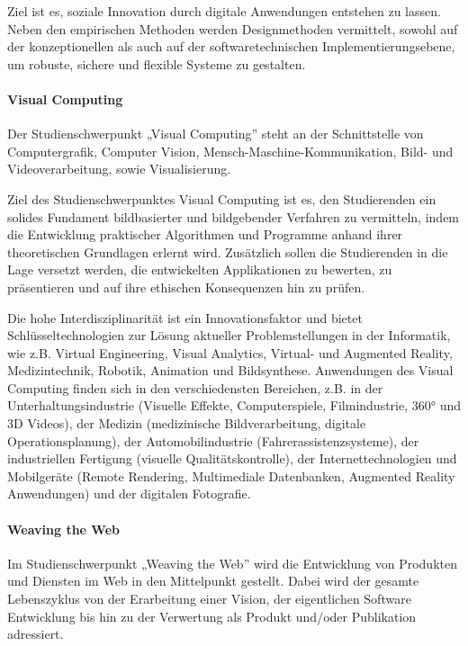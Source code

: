 Ziel ist es, soziale Innovation durch digitale Anwendungen entstehen zu
lassen. Neben den empirischen Methoden werden Designmethoden vermittelt,
sowohl auf der konzeptionellen als auch auf der softwaretechnischen
Implementierungsebene, um robuste, sichere und flexible Systeme zu
gestalten.

\paragraph{Visual Computing}\label{visual-computing}

Der Studienschwerpunkt „Visual Computing'' steht an der Schnittstelle
von Computergrafik, Computer Vision, Mensch-Maschine-Kommunikation,
Bild- und Videoverarbeitung, sowie Visualisierung.

Ziel des Studienschwerpunktes Visual Computing ist es, den Studierenden
ein solides Fundament bildbasierter und bildgebender Verfahren zu
vermitteln, indem die Entwicklung praktischer Algorithmen und Programme
anhand ihrer theoretischen Grundlagen erlernt wird. Zusätzlich sollen
die Studierenden in die Lage versetzt werden, die entwickelten
Applikationen zu bewerten, zu präsentieren und auf ihre ethischen
Konsequenzen hin zu prüfen.

Die hohe Interdisziplinarität ist ein Innovationsfaktor und bietet
Schlüsseltechnologien zur Lösung aktueller Problemstellungen in der
Informatik, wie z.B. Virtual Engineering, Visual Analytics, Virtual- und
Augmented Reality, Medizintechnik, Robotik, Animation und Bildsynthese.
Anwendungen des Visual Computing finden sich in den verschiedensten
Bereichen, z.B. in der Unterhaltungsindustrie (Visuelle Effekte,
Computerspiele, Filmindustrie, 360° und 3D Videos), der Medizin
(medizinische Bildverarbeitung, digitale Operationsplanung), der
Automobilindustrie (Fahrerassistenzsysteme), der industriellen Fertigung
(visuelle Qualitätskontrolle), der Internettechnologien und Mobilgeräte
(Remote Rendering, Multimediale Datenbanken, Augmented Reality
Anwendungen) und der digitalen Fotografie.

\paragraph{Weaving the Web}\label{weaving-the-web}

Im Studienschwerpunkt „Weaving the Web'' wird die Entwicklung von
Produkten und Diensten im Web in den Mittelpunkt gestellt. Dabei wird
der gesamte Lebenszyklus von der Erarbeitung einer Vision, der
eigentlichen Software Entwicklung bis hin zu der Verwertung als Produkt
und/oder Publikation adressiert.

